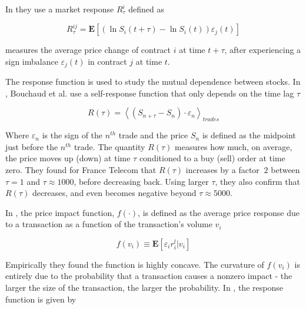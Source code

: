 In \cite{dissecting_cross} they use a market response $R_{\tau}^{i}$ defined as

\begin{equation}\label{eq:dissecting_cross}
    R_{\tau}^{ij} = \mathbf{E} \left[ \left( \ln S_{i}(t+\tau) - \ln S_{i}(t)
    \right) \varepsilon_{j}(t) \right]
\end{equation}

measures the
average price change of contract $i$ at time $t+\tau$, after experiencing a
sign imbalance $\varepsilon_{j}\left(t\right)$ in contract $j$ at time $t$.


The response function is used to study the mutual dependence between stocks. In
\cite{r_walks_liquidity,subtle_nature,Bouchaud_2004}, Bouchaud et al. use a self-response
function that only depends on the time lag $\tau$

\begin{equation}\label{eq:Bouchaud_2004}
    R\left(\tau\right)=\left\langle \left(S_{n+\tau}-S_{n}\right) \cdot
    \varepsilon_{n}\right\rangle_{trades}
\end{equation}

Where $\varepsilon_{n}$ is the sign of the $n^{th}$ trade and the price $S_n$
is defined as the midpoint just before the $n^{th}$ trade.
The quantity $R\left(\tau\right)$ measures how much, on average, the price
moves up (down) at time $\tau$ conditioned to a buy (sell) order at time zero.
They found for France Telecom that $R\left(\tau \right)$ increases by a factor
$~2$ between $\tau = 1$ and $\tau \approx 1000$, before decreasing back. Using
larger $\tau$, they also confirm that $R\left(\tau\right)$ decreases, and even
becomes negative beyond $\tau \approx 5000$.

In \cite{theory_market_impact}, the price impact function,
$f \left(\cdot\right)$, is defined as the average price response due to a
transaction as a function of the transaction's volume $v_{i}$

\begin{equation}\label{eq:theory_market_impact}
    f \left(v_{i}\right) \equiv \mathbf{E} \left[\varepsilon_{i} r^{l}_{i} |
    v_{i}\right]
\end{equation}

Empirically they found  the function is highly concave. The curvature of
$f \left(v_{i}\right)$ is entirely due to the probability that a transaction
causes a nonzero impact - the larger the size of the transaction, the larger
the probability. In \cite{prop_order_book}, the response function is given by

